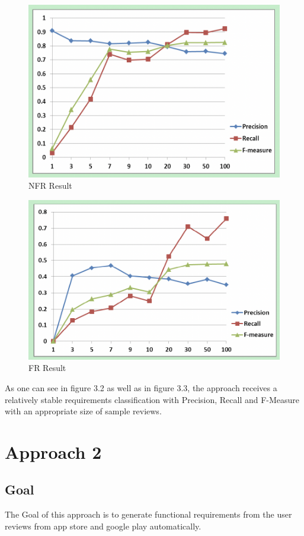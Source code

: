 \begin{figure}[H] 
\centering
\includegraphics[scale=0.5]{../images/Thema1_NFR_Result.png}
\caption{NFR Result}
\label{fig:model}
\end{figure}
\begin{figure}[H] 
\centering
\includegraphics[scale=0.5]{../images/Thema1_FR_Result.png}
\caption{FR Result}
\label{fig:model}
\end{figure}
As one can see in figure 3.2 as well as in figure 3.3, the approach receives a relatively stable requirements classification with Precision, Recall and F-Measure with an appropriate size of sample reviews. 


\chapter{Approach 2}


\section{Goal}
The Goal of this approach is to generate functional requirements from the user reviews from app store and google play automatically.


